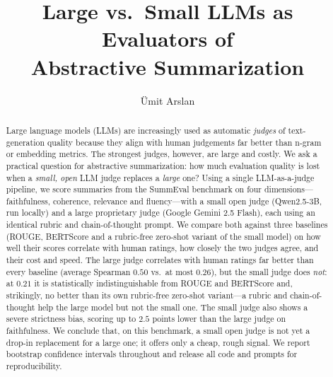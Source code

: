 \documentclass[runningheads]{llncs}
\begin{document}
\title{Large vs.\ Small LLMs as Evaluators of\\ Abstractive Summarization}

\author{\"Umit Arslan}

\maketitle

\begin{abstract}
Large language models (LLMs) are increasingly used as automatic \emph{judges} of
text-generation quality because they align with human judgements far better than
n-gram or embedding metrics. The strongest judges, however, are large and costly.
We ask a practical question for abstractive summarization: how much evaluation
quality is lost when a \emph{small, open} LLM judge replaces a \emph{large} one?
Using a single LLM-as-a-judge pipeline, we score summaries from the SummEval
benchmark on four dimensions---faithfulness, coherence, relevance and
fluency---with a small open judge (Qwen2.5-3B, run locally) and a large proprietary
judge (Google Gemini 2.5 Flash), each using an identical rubric and chain-of-thought
prompt. We
compare both against three baselines (ROUGE, BERTScore and a rubric-free zero-shot
variant of the small model) on how well their scores correlate with human ratings,
how closely the two judges agree, and their cost and speed. The large judge
correlates with human ratings far better than every baseline (average Spearman
$0.50$ vs.\ at most $0.26$), but the small judge does \emph{not}: at $0.21$ it is
statistically indistinguishable from ROUGE and BERTScore and, strikingly, no better
than its own rubric-free zero-shot variant---a rubric and chain-of-thought help the
large model but not the small one. The small judge also shows a severe strictness
bias, scoring up to $2.5$ points lower than the large judge on faithfulness. We
conclude that, on this benchmark, a small open judge is not yet a drop-in
replacement for a large one; it offers only a cheap, rough signal. We report
bootstrap confidence intervals throughout and release all code and prompts for
reproducibility.

\end{abstract}
\end{document}
